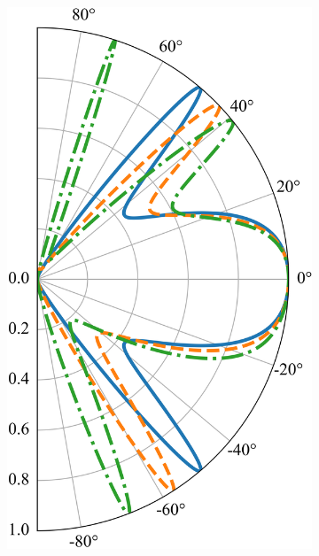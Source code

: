 \begin{figure}[H]
        \begin{subfigure}[b]{0.3\linewidth}
            \includegraphics[width = \linewidth]{fig/tunneling shift/U0.2.png}
            \caption{}
            \label{fig:asym3}
        \end{subfigure}
        \begin{subfigure}[b]{0.3\linewidth}

\end{subfigure}
\end{figure}
